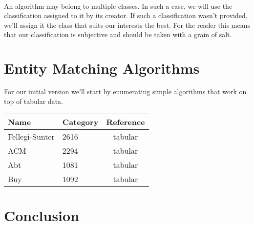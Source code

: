 \documentclass[a4paper,12pt]{article}
\begin{document}
\paragraph{}An algorithm may belong to multiple classes. In such a case,
we will use the classification assigned to it by its creator. If such a
classification wasn't provided, we'll assign it the class that suits our
interests the best. For the reader this means that our classification is
subjective and should be taken with a grain of salt.

\section{Entity Matching Algorithms}
For our initial version we'll start by enumerating simple algorithms that
work on top of tabular data.

\begin{center}
    \begin{tabular}{llc}
        \toprule
        Name & Category & Reference \\
        \midrule
        Fellegi-Sunter & 2616 & tabular & \\
        ACM & 2294 & tabular & \\
        Abt & 1081 & tabular & \\
        Buy & 1092 & tabular & \\
        \bottomrule
    \end{tabular}
\end{center}

\section{Conclusion}
\end{document}
